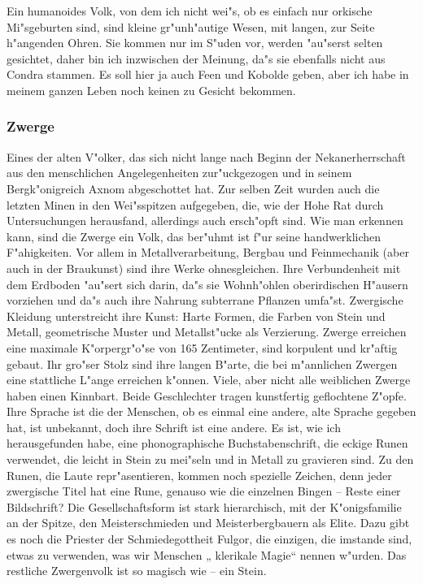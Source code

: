 \documentclass[a5paper,8pt]{book}
\begin{document}
Ein humanoides Volk, von dem ich nicht wei"s, ob es einfach nur orkische Mi"sgeburten sind, sind kleine gr"unh"autige Wesen, mit langen, zur Seite h"angenden Ohren. Sie kommen nur im S"uden vor, werden "au"serst selten gesichtet, daher bin ich inzwischen der Meinung, da"s sie ebenfalls nicht aus Condra stammen. Es soll hier ja auch Feen und Kobolde geben, aber ich habe in meinem ganzen Leben noch keinen zu Gesicht bekommen. 

\newpage

\subsubsection{Zwerge}

Eines der alten V"olker, das sich nicht lange nach Beginn der Nekanerherrschaft aus den menschlichen Angelegenheiten zur"uckgezogen und in seinem Bergk"onigreich Axnom abgeschottet hat. Zur selben Zeit wurden auch die letzten Minen in den Wei"sspitzen aufgegeben, die, wie der Hohe Rat durch Untersuchungen herausfand, allerdings auch ersch"opft sind. Wie man erkennen kann, sind die Zwerge ein Volk, das ber"uhmt ist f"ur seine handwerklichen F"ahigkeiten. Vor allem in Metallverarbeitung, Bergbau und Feinmechanik (aber auch in der Braukunst) sind ihre Werke ohnesgleichen. Ihre Verbundenheit mit dem Erdboden "au"sert sich darin, da"s sie Wohnh"ohlen oberirdischen H"ausern vorziehen und da"s auch ihre Nahrung subterrane Pflanzen umfa"st.  Zwergische Kleidung unterstreicht ihre Kunst: Harte Formen, die Farben von Stein und Metall, geometrische Muster und Metallst"ucke als Verzierung. Zwerge erreichen eine maximale K"orpergr"o"se von 165 Zentimeter, sind korpulent und kr"aftig gebaut. Ihr gro"ser Stolz 
sind ihre langen B"arte, die bei m"annlichen Zwergen eine stattliche L"ange erreichen k"onnen. Viele, aber nicht alle weiblichen Zwerge haben einen Kinnbart. Beide Geschlechter tragen kunstfertig geflochtene Z"opfe.  Ihre Sprache ist die der Menschen, ob es  einmal eine andere, alte Sprache gegeben hat, ist unbekannt, doch ihre Schrift ist eine andere. Es ist, wie ich herausgefunden habe, eine phonographische Buchstabenschrift, die eckige Runen verwendet, die leicht in Stein zu mei"seln und in Metall zu gravieren sind. Zu den Runen, die Laute repr"asentieren, kommen noch spezielle Zeichen, denn jeder zwergische Titel hat eine Rune, genauso wie die einzelnen Bingen – Reste einer Bildschrift? Die Gesellschaftsform ist stark hierarchisch, mit der K"onigsfamilie an der Spitze, den Meisterschmieden und Meisterbergbauern als Elite. Dazu gibt es noch die Priester der Schmiedegottheit Fulgor, die einzigen, die imstande sind, etwas zu verwenden, was wir Menschen „ klerikale Magie“ nennen w"urden. Das restliche 
Zwergenvolk ist so magisch wie – ein Stein. 
\end{document}
